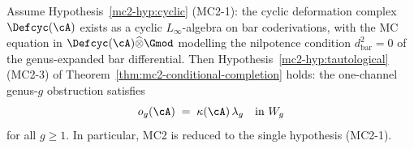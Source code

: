 \begin{theorem}\label{thm:tautological-line-support}
Assume Hypothesis~\textup{\ref{mc2-hyp:cyclic}} \textup{(MC2-1)}: the
cyclic deformation complex $\Defcyc(\cA)$ exists as a cyclic
$L_\infty$-algebra on bar coderivations, with the MC equation in
$\Defcyc(\cA)\widehat{\otimes}\Gmod$ modelling the nilpotence
condition $d_{\mathrm{bar}}^2 = 0$ of the genus-expanded bar
differential.
Then Hypothesis~\textup{\ref{mc2-hyp:tautological}} \textup{(MC2-3)}
of Theorem~\textup{\ref{thm:mc2-conditional-completion}} holds: the
one-channel genus-$g$ obstruction satisfies
\[
  o_g(\cA) \;=\; \kappa(\cA)\,\lambda_g
  \quad\text{in } W_g
\]
for all $g \geq 1$.  In particular, MC2 is reduced to the single
hypothesis \textup{(MC2-1)}.
\end{theorem}

